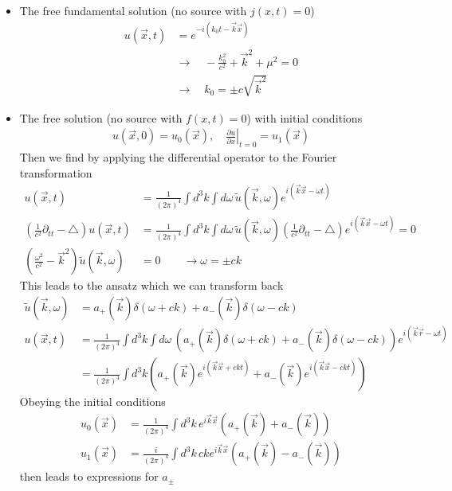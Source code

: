 \documentclass[../main.tex]{subfiles}
\begin{document}
\begin{itemize}
\item The free fundamental solution (no source with $j(x,t)=0$)
\begin{align}
u(\vec{x},t)&=e^{-i(k_0t-\vec{k}\vec{x})}\\
&\rightarrow\quad -\frac{k_0^2}{c^2}+\vec{k}^2+\mu^2=0\\
&\rightarrow\quad k_0=\pm c\sqrt{\vec{k}^2}
\end{align}

\item The free solution (no source with $f(x,t)=0$) with initial conditions
\begin{align}
u(\vec{x},0)=u_0(\vec{x}),\quad \left.\frac{\partial u}{\partial x}\right|_{t=0}=u_1(\vec{x})
\end{align}
Then we find by applying the differential operator to the Fourier transformation
\begin{align}
u(\vec{x},t)&=\frac{1}{(2\pi)^4}\int d^3k\int d\omega\, \tilde{u}(\vec{k},\omega)e^{i(\vec{k}\vec{x}-\omega t)}\\
\left(\frac{1}{c^2}\partial_{tt}-\triangle\right) u(\vec{x},t)&=\frac{1}{(2\pi)^4}\int d^3k\int d\omega\, \tilde{u}(\vec{k},\omega)\left(\frac{1}{c^2}\partial_{tt}-\triangle\right)e^{i(\vec{k}\vec{x}-\omega t)}=0\\
\left(\frac{\omega^2}{c^2}-\vec{k}^2\right)\tilde{u}(\vec{k},\omega)&=0\qquad\rightarrow\omega=\pm ck
\end{align}
This leads to the ansatz which we can transform back
\begin{align}
\tilde{u}(\vec{k},\omega)&=a_+(\vec{k})\delta(\omega+ck)+a_-(\vec{k})\delta(\omega-ck)\\
u(\vec{x},t)
&=\frac{1}{(2\pi)^4}\int d^3k\int d\omega\, \left(a_+(\vec{k})\delta(\omega+ck)+a_-(\vec{k})\delta(\omega-ck)\right)e^{i(\vec{k}\vec{r}-\omega t)}\\
&=\frac{1}{(2\pi)^4}\int d^3k \left(a_+(\vec{k})e^{i(\vec{k}\vec{x}+ckt)}+a_-(\vec{k})e^{i(\vec{k}\vec{x}-ckt)}\right)
\end{align}
Obeying the initial conditions
\begin{align}
u_0(\vec{x})&=\frac{1}{(2\pi)^4}\int d^3k\, e^{i\vec{k}\vec{x}}\left(a_+(\vec{k})+a_-(\vec{k})\right)\\
u_1(\vec{x})&=\frac{i}{(2\pi)^4}\int d^3k\, cke^{i\vec{k}\vec{x}}\left(a_+(\vec{k})-a_-(\vec{k})\right)
\end{align}
then leads to expressions for $a_\pm$
\begin{align}

\end{align}
\end{itemize}
\end{document}
